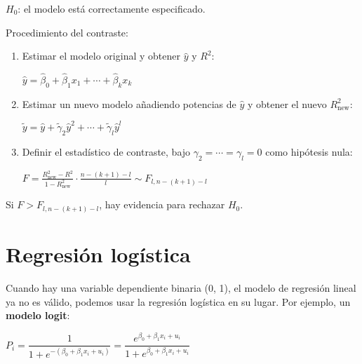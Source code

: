 \documentclass[10pt, a4paper, landscape]{article}
\begin{document}
\begin{multicols}{3}
		\begin{center}
			$H_{0}$: el modelo está correctamente especificado.
		\end{center}
		
		Procedimiento del contraste:
		
		\begin{enumerate}[leftmargin=*]
			\item Estimar el modelo original y obtener $\hat{y}$ y $R^{2}$:
			
			\begin{center}
				$\hat{y} = \hat{\beta}_{0} + \hat{\beta}_{1} x_{1} + \cdots + \hat{\beta}_{k} x_{k}$
			\end{center}
			
			\item Estimar un nuevo modelo añadiendo potencias de $\hat{y}$ y obtener el nuevo $R^{2}_{\mathrm{new}}$:
			
			\begin{center}
				$\tilde{y} = \hat{y} + \tilde{\gamma}_{2} \hat{y}^{2} + \cdots + \tilde{\gamma}_{l} \hat{y}^{l}$
			\end{center}
			
			\item Definir el estadístico de contraste, bajo $\gamma_{2} = \cdots = \gamma_{l} = 0$ como hipótesis nula:
			
			\begin{center}
				$F = \frac{R^{2}_{\mathrm{new}} - R^{2}}{1 - R^{2}_{\mathrm{new}}} \cdot \frac{n - (k + 1) - l}{l} \sim F_{l, n - (k + 1) - l}$
			\end{center}
		\end{enumerate}
		
		Si $F > F_{l, n - (k + 1) - l}$, hay evidencia para rechazar $H_{0}$.
		
		\section*{Regresión logística}
		
		Cuando hay una variable dependiente binaria (0, 1), el modelo de regresión lineal ya no es válido, podemos usar la regresión logística en su lugar. Por ejemplo, un \textbf{modelo logit}:
		
		\begin{center}
			$P_{i} = \dfrac{1}{1 + e^{-(\beta_{0} + \beta_{1} x_{i} + u_{i})}}= \dfrac{e^{\beta_{0} + \beta_{1} x_{i} + u_{i}}}{1 + e^{\beta_{0} + \beta_{1} x_{i} + u_{i}}}$
		\end{center}
		

\end{multicols}
\end{document}
